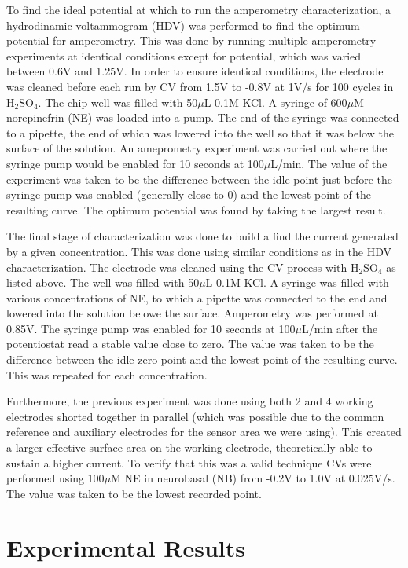 \documentclass{article}
\begin{document}
To find the ideal potential at which to run the amperometry characterization, a hydrodinamic voltammogram (HDV) was performed to find the optimum potential for amperometry. This was done by running multiple amperometry experiments at identical conditions except for potential, which was varied between 0.6V and 1.25V. In order to ensure identical conditions, the electrode was cleaned before each run by CV from 1.5V to -0.8V at 1V/s for 100 cycles in $\mathrm{H}_2 \mathrm{SO}_4$. The chip well was filled with 50$\mu$L 0.1M KCl. A syringe of 600$\mu$M norepinefrin (NE) was loaded into a pump. The end of the syringe was connected to a pipette, the end of which was lowered into the well so that it was below the surface of the solution. An ameprometry experiment was carried out where the syringe pump would be enabled for 10 seconds at 100$\mu$L/min. The value of the experiment was taken to be the difference between the idle point just before the syringe pump was enabled (generally close to 0) and the lowest point of the resulting curve. The optimum potential was found by taking the largest result.

The final stage of characterization was done to build a find the current generated by a given concentration. This was done using similar conditions as in the HDV characterization. The electrode was cleaned using the CV process with $\mathrm{H}_2 \mathrm{SO}_4$ as listed above. The well was filled with 50$\mu$L 0.1M KCl. A syringe was filled with various concentrations of NE, to which a pipette was connected to the end and lowered into the solution belowe the surface. Amperometry was performed at 0.85V. The syringe pump was enabled for 10 seconds at 100$\mu$L/min after the potentiostat read a stable value close to zero. The value was taken to be the difference between the idle zero point and the lowest point of the resulting curve. This was repeated for each concentration.

Furthermore, the previous experiment was done using both 2 and 4 working electrodes shorted together in parallel (which was possible due to the common reference and auxiliary electrodes for the sensor area we were using). This created a larger effective surface area on the working electrode, theoretically able to sustain a higher current. To verify that this was a valid technique CVs were performed using 100$\mu$M NE in neurobasal (NB) from -0.2V to 1.0V at 0.025V/s. The value was taken to be the lowest recorded point.

\section{Experimental Results}
\end{document}
